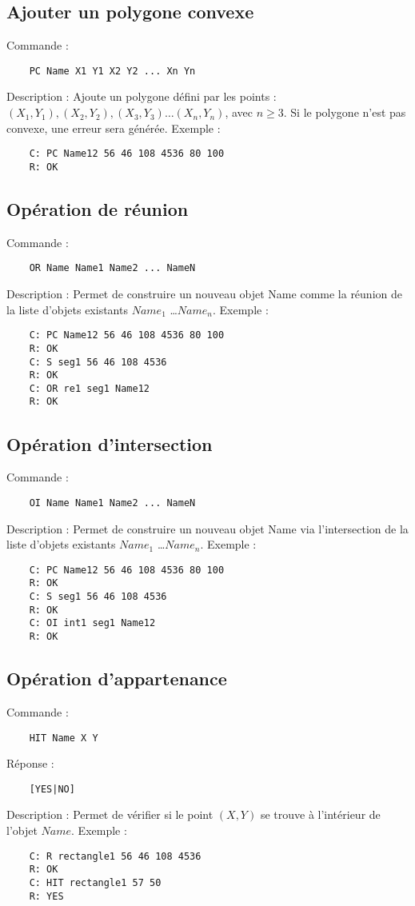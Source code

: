 \documentclass[oneside]{book}
\begin{document}
\subsection*{Ajouter un polygone convexe}
Commande : 
\begin{lstlisting}
	PC Name X1 Y1 X2 Y2 ... Xn Yn
\end{lstlisting}
Description : Ajoute un polygone défini par les points : $(X_1,Y_1), (X_2,Y_2), (X_3,Y_3) \ldots (X_n,Y_n)$, avec $n \geq 3$. Si le polygone n'est pas convexe, une erreur sera générée.\newline
Exemple :
\begin{lstlisting}
	C: PC Name12 56 46 108 4536 80 100
	R: OK
\end{lstlisting}

\subsection*{Opération de réunion}
Commande : 
\begin{lstlisting}
	OR Name Name1 Name2 ... NameN
\end{lstlisting}
Description : Permet de construire un nouveau objet Name comme la réunion de la liste d'objets existants $Name_1$ \ldots $Name_n$. \newline
Exemple :
\begin{lstlisting}
	C: PC Name12 56 46 108 4536 80 100
	R: OK
	C: S seg1 56 46 108 4536
	R: OK
	C: OR re1 seg1 Name12
	R: OK
\end{lstlisting}

\subsection*{Opération d'intersection}
Commande : 
\begin{lstlisting}
	OI Name Name1 Name2 ... NameN
\end{lstlisting}
Description : Permet de construire un nouveau objet Name via l'intersection de la liste d'objets existants $Name_1$ \ldots $Name_n$. \newline
Exemple :
\begin{lstlisting}
	C: PC Name12 56 46 108 4536 80 100
	R: OK
	C: S seg1 56 46 108 4536
	R: OK
	C: OI int1 seg1 Name12
	R: OK
\end{lstlisting}

\subsection*{Opération d'appartenance}
Commande : 
\begin{lstlisting}
	HIT Name X Y
\end{lstlisting}
Réponse : 
\begin{lstlisting}
	[YES|NO]
\end{lstlisting}
Description : Permet de vérifier si le point $(X, Y)$ se trouve à l'intérieur de l'objet $Name$.\newline
Exemple :
\begin{lstlisting}
	C: R rectangle1 56 46 108 4536
	R: OK
	C: HIT rectangle1 57 50
	R: YES
\end{lstlisting}
\end{document}

